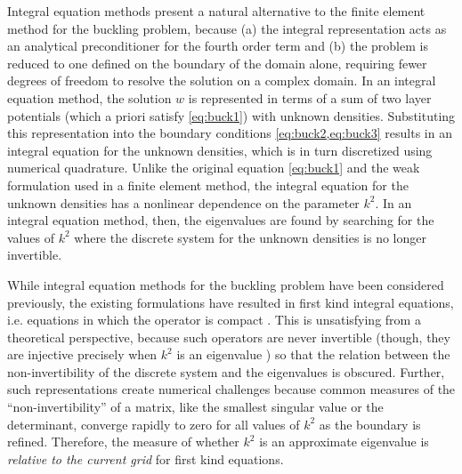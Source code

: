 Integral equation methods \cite{kress1989linear,
  atkinson2009numerical,kitahara2014boundary} present
a natural alternative to the finite element method
for the buckling problem, because (a) the
integral representation acts as an analytical preconditioner
for the fourth order term and (b) the problem is reduced
to one defined on the boundary of the domain alone,
requiring fewer degrees of freedom to resolve the solution
on a complex domain. In an integral equation method,
the solution $w$ is represented in terms of a sum of
two layer potentials (which a priori satisfy
\cref{eq:buck1}) with unknown densities. Substituting this
representation into the boundary conditions
\cref{eq:buck2,eq:buck3} results in an integral equation
for the unknown densities, which
is in turn discretized using numerical quadrature.
Unlike the original equation \cref{eq:buck1} and the weak
formulation used in a finite element method, the integral
equation for the unknown densities has a nonlinear dependence
on the parameter $k^2$. In an integral equation method, then,
the eigenvalues are found by searching for the values
of $k^2$ where the discrete system for the unknown densities
is no longer invertible.

While integral equation methods for the buckling problem
have been considered previously, the existing formulations
have resulted in first kind integral equations, i.e. equations
in which the operator is compact \cite{kitahara2014boundary,
  antunes2011buckling}. This is unsatisfying from a theoretical
perspective, because such operators are never invertible
(though, they are injective precisely when $k^2$ is an
eigenvalue \cite{kitahara2014boundary}) so that the
relation between the non-invertibility of the discrete system
and the eigenvalues is obscured. Further, such representations
create numerical challenges because common measures of the
``non-invertibility'' of a matrix, like the smallest singular
value or the determinant, converge rapidly to zero for all
values of $k^2$ as the boundary is refined. Therefore, the
measure of whether $k^2$ is an approximate eigenvalue is
{\em relative to the current grid} for first kind equations.

